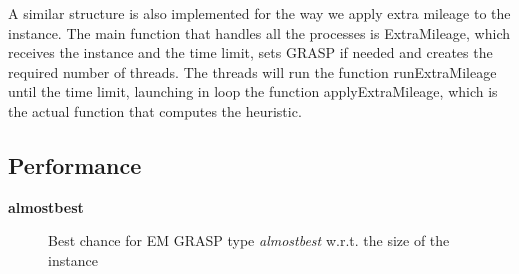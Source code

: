 A similar structure is also implemented for the way we apply extra mileage to the instance. The main function that handles 
all the processes is ExtraMileage, which receives the instance and the time limit, sets GRASP if needed and creates the 
required number of threads.
The threads will run the function runExtraMileage until the time limit, launching in loop the function applyExtraMileage, 
which is the actual function that computes the heuristic.

\subsection{Performance}

\textbf{almostbest}

\begin{figure}[htbp]
	\centering
	\caption{Best chance for EM GRASP type \textit{almostbest} w.r.t. the size of the instance}
    \label{fig:emAlmostbestFunction}
\end{figure}

